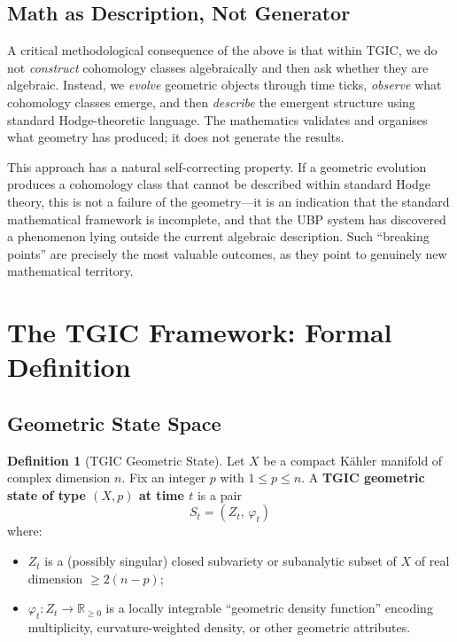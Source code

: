 \documentclass[11pt,a4paper]{article}
\theoremstyle{definition}
\newtheorem{definition}{Definition}[section]
\theoremstyle{plain}
\newcommand{\RR}{\mathbb{R}}
\begin{document}
\subsection{Math as Description, Not Generator}

A critical methodological consequence of the above is that within TGIC, we do not \emph{construct} cohomology classes algebraically and then ask whether they are algebraic. Instead, we \emph{evolve} geometric objects through time ticks, \emph{observe} what cohomology classes emerge, and then \emph{describe} the emergent structure using standard Hodge-theoretic language. The mathematics validates and organises what geometry has produced; it does not generate the results.

This approach has a natural self-correcting property. If a geometric evolution produces a cohomology class that cannot be described within standard Hodge theory, this is not a failure of the geometry---it is an indication that the standard mathematical framework is incomplete, and that the UBP system has discovered a phenomenon lying outside the current algebraic description. Such ``breaking points'' are precisely the most valuable outcomes, as they point to genuinely new mathematical territory.


\section{The TGIC Framework: Formal Definition}\label{sec:framework}

\subsection{Geometric State Space}

\begin{definition}[TGIC Geometric State]\label{def:geo-state}
Let $X$ be a compact K\"ahler manifold of complex dimension $n$. Fix an integer $p$ with $1 \leq p \leq n$. A \textbf{TGIC geometric state of type $(X, p)$ at time $t$} is a pair
\begin{equation}\label{eq:state}
S_t = (Z_t,\, \varphi_t)
\end{equation}
where:
\begin{itemize}[nosep]
\item $Z_t$ is a (possibly singular) closed subvariety or subanalytic subset of $X$ of real dimension $\geq 2(n - p)$;
\item $\varphi_t: Z_t \to \RR_{\geq 0}$ is a locally integrable ``geometric density function'' encoding multiplicity, curvature-weighted density, or other geometric attributes.
\end{itemize}
\end{definition}
\end{document}
